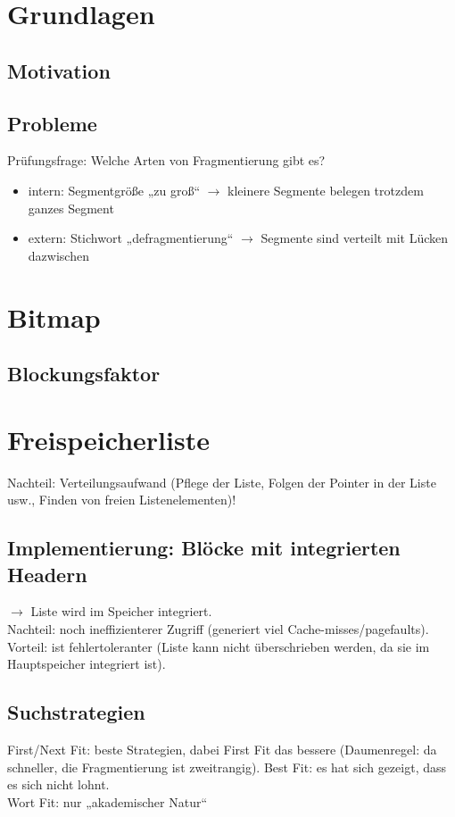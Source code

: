 \section{Grundlagen}
\subsection{Motivation}
\subsection{Probleme}
Prüfungsfrage: Welche Arten von Fragmentierung gibt es?
\begin{itemize}
\item intern: Segmentgröße „zu groß“ $\to$ kleinere Segmente belegen trotzdem ganzes Segment
\item extern: Stichwort „defragmentierung“ $\to$ Segmente sind verteilt mit Lücken dazwischen
\end{itemize}

\section{Bitmap}
\subsection*{Blockungsfaktor}

\section{Freispeicherliste}
Nachteil: Verteilungsaufwand (Pflege der Liste, Folgen der Pointer in der Liste usw., Finden von freien Listenelementen)!
\subsection{Implementierung: Blöcke mit integrierten Headern}
$\to$ Liste wird im Speicher integriert.\\
Nachteil: noch ineffizienterer Zugriff (generiert viel Cache-misses/pagefaults).\\
Vorteil: ist fehlertoleranter (Liste kann nicht überschrieben werden, da sie im Hauptspeicher integriert ist).
\subsection{Suchstrategien}
First/Next Fit: beste Strategien, dabei First Fit das bessere (Daumenregel: da schneller, die Fragmentierung ist zweitrangig).
Best Fit: es hat sich gezeigt, dass es sich nicht lohnt.\\
Wort Fit: nur „akademischer Natur“
